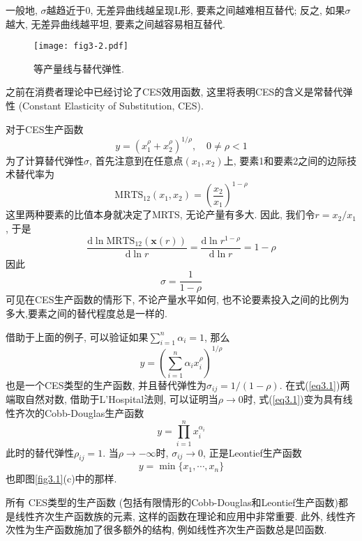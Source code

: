 \documentclass[cn, 12pt, math=mtpro2, bibstyle=apa, blue]{elegantbook}
\newcommand{\x}{\mathbf{x}}
\begin{document}
一般地, $\sigma$越趋近于0, 无差异曲线越呈现L形, 要素之间越难相互替代; 反之, 如果$\sigma$越大, 无差异曲线越平坦, 要素之间越容易相互替代.

\begin{figure}[htbp!]
  \centering
  \texttt{[image: fig3-2.pdf]}
  \caption{等产量线与替代弹性.}\label{fig3.2}
\end{figure}

\begin{example}[$\,$CES生产函数]
之前在消费者理论中已经讨论了CES效用函数, 这里将表明CES的含义是常替代弹性 (Constant Elasticity of Substitution, CES).

对于CES生产函数
$$y=(x_1^\rho+x_2^\rho)^{1/\rho},\quad 0\neq \rho<1$$
为了计算替代弹性$\sigma$, 首先注意到在任意点$(x_1,x_2)$上, 要素1和要素2之间的边际技术替代率为
$$\text{MRTS}_{12}(x_1,x_2)=\left(\frac{x_2}{x_1}\right)^{1-\rho}$$
这里两种要素的比值本身就决定了MRTS, 无论产量有多大. 因此, 我们令$r=x_2/x_1$, 于是
$$\frac{\text{d}\ln\text{MRTS}_{12}(\x(r))}{\text{d}\ln r}=\frac{\text{d}\ln r^{1-\rho}}{\text{d}\ln r}=1-\rho$$
因此
$$\sigma=\frac{1}{1-\rho}$$
可见在CES生产函数的情形下, 不论产量水平如何, 也不论要素投入之间的比例为多大,要素之间的替代程度总是一样的.
\end{example}

借助于上面的例子, 可以验证如果$\sum_{i=1}^{n}\alpha_i=1$, 那么
\begin{equation}\label{eq3.1}
  y=\left(\sum_{i=1}^{n}\alpha_ix_i^\rho\right)^{1/\rho}
\end{equation}
也是一个CES类型的生产函数, 并且替代弹性为$\sigma_{ij}=1/(1-\rho)$. 在式(\ref{eq3.1})两端取自然对数, 借助于L'Hospital法则, 可以证明当$\rho\to0$时, 式(\ref{eq3.1})变为具有线性齐次的Cobb-Douglas生产函数
$$y=\prod_{i=1}^{n}x_i^{\alpha_i}$$
此时的替代弹性$\rho_{ij}=1$. 当$\rho\to-\infty$时, $\sigma_{ij}\to 0$, 正是Leontief生产函数
$$y=\min\{x_1,\cdots,x_n\}$$
也即图\ref{fig3.1}(c)中的那样.

所有 CES类型的生产函数 (包括有限情形的Cobb-Douglas和Leontief生产函数)都是线性齐次生产函数族的元素, 这样的函数在理论和应用中非常重要. 此外, 线性齐次性为生产函数施加了很多额外的结构, 例如线性齐次生产函数总是凹函数.
\end{document}

